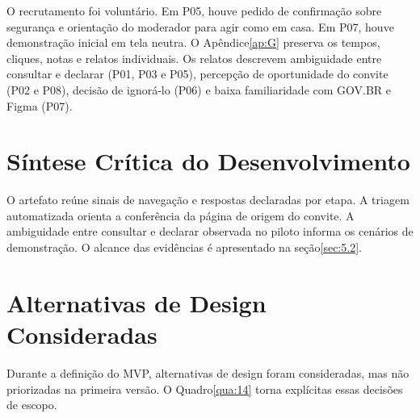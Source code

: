 O recrutamento foi voluntário. Em P05, houve pedido de confirmação sobre segurança e orientação do moderador para agir como em casa. Em P07, houve demonstração inicial em tela neutra. O Apêndice\nobreakspace{}\ref{ap:G} preserva os tempos, cliques, notas e relatos individuais. Os relatos descrevem ambiguidade entre consultar e declarar (P01, P03 e P05), percepção de oportunidade do convite (P02 e P08), decisão de ignorá-lo (P06) e baixa familiaridade com GOV.BR e Figma (P07).

\section{Síntese Crítica do Desenvolvimento}
\label{sec:4.15}

O artefato reúne sinais de navegação e respostas declaradas por etapa. A triagem automatizada orienta a conferência da página de origem do convite. A ambiguidade entre consultar e declarar observada no piloto informa os cenários de demonstração. O alcance das evidências é apresentado na seção\nobreakspace{}\ref{sec:5.2}.

\section{Alternativas de Design Consideradas}
\label{sec:4.16}

Durante a definição do MVP, alternativas de design foram consideradas, mas não priorizadas na primeira versão. O Quadro\nobreakspace{}\ref{qua:14} torna explícitas essas decisões de escopo.

